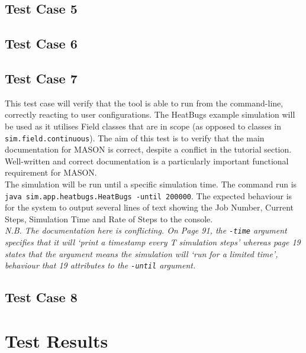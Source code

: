 \documentclass[11pt]{article}
\begin{document}
\subsection{Test Case 5}

\subsection{Test Case 6}

\subsection{Test Case 7}
This test case will verify that the tool is able to run from the command-line, correctly reacting to user configurations.
The HeatBugs example simulation will be used as it utilises Field classes that are in scope (as opposed to classes in \texttt{sim.field.continuous}).
The aim of this test is to verify that the main documentation for MASON is correct, despite a conflict in the tutorial section.
Well-written and correct documentation is a particularly important functional requirement for MASON.
\\

The simulation will be run until a specific simulation time.
The command run is \texttt{java sim.app.heatbugs.HeatBugs -until 200000}.
The expected behaviour is for the system to output several lines of text showing the Job Number, Current Steps, Simulation Time and Rate of Steps to the console.
\\

\textit{N.B. The documentation here is conflicting. On Page 91, the \texttt{-time} argument specifies that it will `print a timestamp every T simulation steps' whereas page 19 states that the argument means the simulation will `run for a limited time', behaviour that 19 attributes to the \texttt{-until} argument.}

\subsection{Test Case 8}


\newpage
\section{Test Results}%
\end{document}
